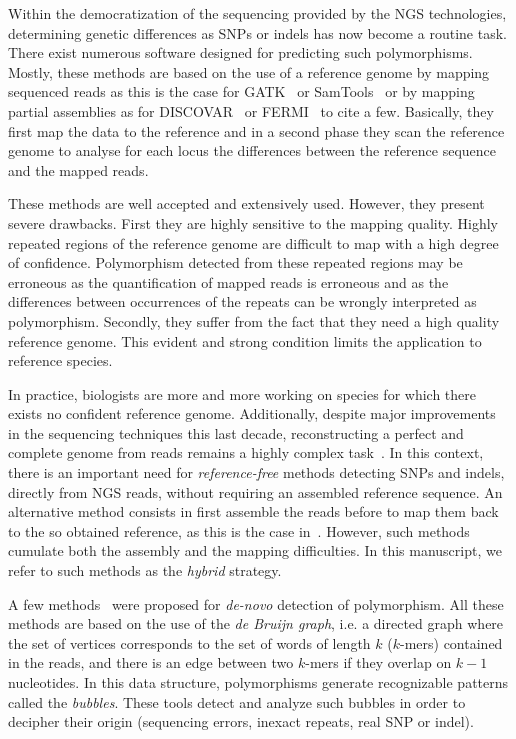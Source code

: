 \documentclass{bmcart}
\begin{document}
Within the democratization of the sequencing provided by the NGS technologies, determining genetic differences as SNPs or indels has now become a routine task.
There exist numerous software designed for predicting such polymorphisms. Mostly, these methods are based on the use of a reference genome by mapping sequenced reads as this is the case for GATK~\cite{gatk} or SamTools~\cite{Li2009} 
 or by mapping partial assemblies as for DISCOVAR~\cite{Weisenfeld2014} or FERMI~\cite{Li2012} to cite a few. Basically, they first map the data to the reference and in a second phase they scan the reference genome to analyse for each locus the differences between the reference sequence and the mapped reads. 

These methods are well accepted and extensively used. However, they present severe drawbacks. First they are highly 
sensitive to the mapping quality. Highly repeated regions of the reference genome are difficult to map with a high degree of confidence.  Polymorphism detected from these repeated regions may be erroneous as the quantification of mapped reads is erroneous and as the differences between occurrences of the repeats can be wrongly interpreted as polymorphism. Secondly, they suffer from the fact that they need a high quality reference genome. This evident and strong condition limits the application to reference species. 

In practice, biologists are more and more working on species for which there exists no confident reference genome. Additionally, despite major improvements in the sequencing techniques this last decade, reconstructing a perfect and complete genome from reads remains a highly complex task~\cite{assemblathon2}. In this context, there is an important need for \emph{reference-free} methods detecting SNPs and indels, directly from NGS reads, without requiring an assembled reference sequence. An alternative method consists in first assemble the reads before to map them back to the so obtained reference, as this is the case in~\cite{Willing2011}. However, such methods cumulate both the assembly and the mapping difficulties. In this manuscript, we refer to such methods as the \emph{hybrid} strategy. 

A few methods~\cite{Peterlongo2010,iqbal2012novo,Leggett2013,Nordstrom2013,Kissplice} were proposed for \emph{de-novo} detection of polymorphism.  All these methods are based on the use of the \emph{de Bruijn graph}, i.e. a directed graph where the set of vertices corresponds to the set of words of length $k$ ($k$-mers) contained in the reads, and there is an edge between two $k$-mers if they overlap on $k-1$ nucleotides. In this data structure, polymorphisms generate recognizable patterns called the \emph{bubbles}. These tools detect and analyze such bubbles in order to decipher their origin (sequencing errors, inexact repeats, real SNP or indel). 
\end{document}
